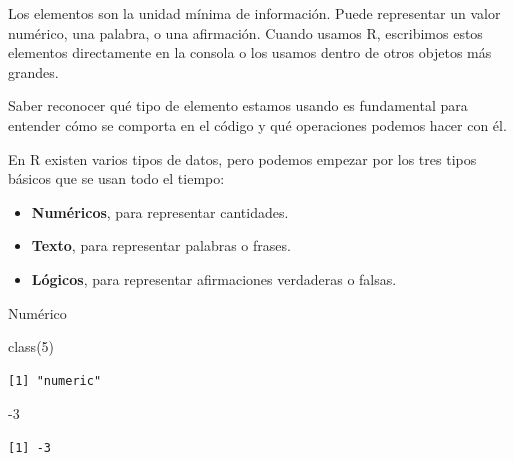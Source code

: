 \documentclass[
  letterpaper,
  DIV=11,
  numbers=noendperiod,
  twoside]{scrreprt}
\newenvironment{Shaded}{\begin{snugshade}}{\end{snugshade}}
\newcommand{\DecValTok}[1]{\textcolor[rgb]{0.68,0.00,0.00}{#1}}
\newcommand{\FunctionTok}[1]{\textcolor[rgb]{0.28,0.35,0.67}{#1}}
\newcommand{\NormalTok}[1]{\textcolor[rgb]{0.00,0.23,0.31}{#1}}
\newcommand{\SpecialCharTok}[1]{\textcolor[rgb]{0.37,0.37,0.37}{#1}}
\begin{document}
Los elementos son la unidad mínima de información. Puede representar un
valor numérico, una palabra, o una afirmación. Cuando usamos R,
escribimos estos elementos directamente en la consola o los usamos
dentro de otros objetos más grandes.

Saber reconocer qué tipo de elemento estamos usando es fundamental para
entender cómo se comporta en el código y qué operaciones podemos hacer
con él.

\begin{tcolorbox}[enhanced jigsaw, titlerule=0mm, title=\textcolor{quarto-callout-note-color}{\faInfo}\hspace{0.5em}{Dato}, colback=white, opacityback=0, breakable, toprule=.15mm, left=2mm, leftrule=.75mm, colframe=quarto-callout-note-color-frame, bottomtitle=1mm, rightrule=.15mm, opacitybacktitle=0.6, coltitle=black, arc=.35mm, bottomrule=.15mm, toptitle=1mm, colbacktitle=quarto-callout-note-color!10!white]

En R existen varios tipos de datos, pero podemos empezar por los tres
tipos básicos que se usan todo el tiempo:

\begin{itemize}
\item
  \textbf{Numéricos}, para representar cantidades.
\item
  \textbf{Texto}, para representar palabras o frases.
\item
  \textbf{Lógicos}, para representar afirmaciones verdaderas o falsas.
\end{itemize}

\end{tcolorbox}

Numérico

\begin{Shaded}
\begin{Highlighting}[]
\FunctionTok{class}\NormalTok{(}\DecValTok{5}\NormalTok{)}
\end{Highlighting}
\end{Shaded}

\begin{verbatim}
[1] "numeric"
\end{verbatim}

\begin{Shaded}
\begin{Highlighting}[]
\SpecialCharTok{{-}}\DecValTok{3}
\end{Highlighting}
\end{Shaded}

\begin{verbatim}
[1] -3
\end{verbatim}
\end{document}
